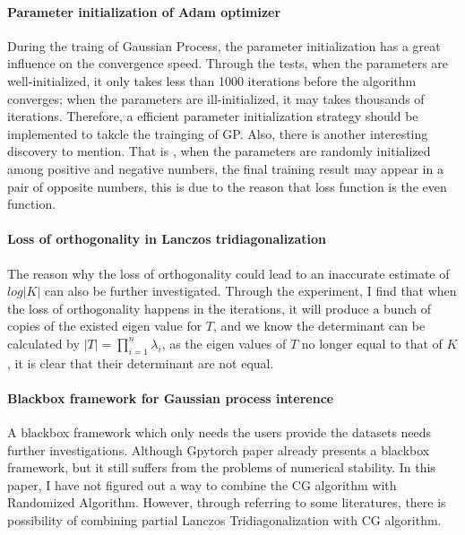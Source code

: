 \documentclass{article}
\begin{document}
\paragraph{Parameter initialization of Adam optimizer} During the traing of Gaussian Process, the parameter initialization has a great influence on the convergence speed. Through the tests, when the parameters are well-initialized, it only takes less than 1000 iterations before the algorithm converges; when the parameters are ill-initialized, it may takes thousands of iterations. Therefore, a efficient parameter initialization strategy should be implemented to takcle the trainging of GP. Also, there is another interesting discovery to mention. That is , when the parameters are randomly initialized among positive and negative numbers, the final training result may appear in a pair of opposite numbers, this is due to the reason that loss function is the even function.
\paragraph{Loss of orthogonality in Lanczos tridiagonalization} The reason why the loss of orthogonality could lead to an inaccurate estimate of $log|K|$ can also be further investigated. Through the experiment, I find that when the loss of orthogonality happens in the iterations, it will produce a bunch of copies of the existed eigen value for $T$, and we know the determinant can be calculated by $|T|=\prod_{i=1}^{n}\lambda_i$, as the eigen values of $T$ no longer equal to that of $K$, it is clear that their determinant are not equal.

\paragraph{Blackbox framework for Gaussian process interence} A blackbox framework which only needs the users provide the datasets needs further investigations. Although Gpytorch paper already presents a blackbox framework, but it still suffers from the problems of numerical stability. In this paper, I have not figured out a way to combine the CG algorithm with Randomized Algorithm. However, through referring to some literatures, there is possibility of combining partial Lanczos Tridiagonalization with CG algorithm.
\end{document}
